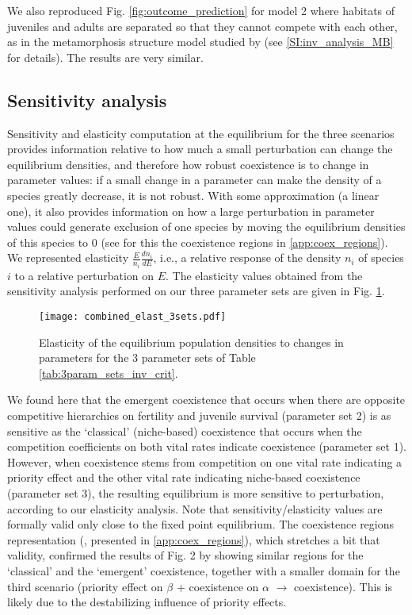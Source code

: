 \documentclass{article}
\begin{document}
We also reproduced Fig. \ref{fig:outcome_prediction} for model 2 where habitats of juveniles and adults are separated so that they cannot compete with each other, as in the metamorphosis structure model studied by \citet{moll2008competition} (see \ref{SI:inv_analysis_MB} for details). The results are very similar.

\subsection{Sensitivity analysis}

Sensitivity and elasticity computation at the equilibrium for the three scenarios provides information relative to how much a small perturbation can change the equilibrium densities, and therefore how robust coexistence is to change in parameter values: if a small change in a parameter can make the density of a species greatly decrease, it is not robust. With some approximation (a linear one), it also provides information on how a large perturbation in parameter values could generate exclusion of one species by moving the equilibrium densities of this species to 0 (see for this the coexistence regions in \ref{app:coex_regions}). We represented elasticity $\frac{E}{n_i}\frac{dn_i}{dE}$, i.e., a relative response of the density $n_i$ of species $i$ to a relative perturbation on $E$. The elasticity values obtained from the sensitivity analysis performed on our three parameter sets are given in Fig. \ref{fig:tab_elast_3sets}. 

\begin{figure}[H]
    \centering
    \texttt{[image: combined\_elast\_3sets.pdf]}
    \caption{Elasticity of the equilibrium population
densities to changes in parameters for the 3 parameter sets of Table \ref{tab:3param_sets_inv_crit}.}
    \label{fig:tab_elast_3sets}
\end{figure}
 We found here that the emergent coexistence that occurs when there are opposite competitive hierarchies on fertility and juvenile survival (parameter set 2) is as sensitive as the `classical' (niche-based) coexistence that occurs when the competition coefficients on both vital rates indicate coexistence (parameter set 1). However, when coexistence stems from competition on one vital rate indicating a priority effect and the other vital rate indicating niche-based coexistence (parameter set 3), the resulting equilibrium is more sensitive to perturbation, according to our elasticity analysis. Note that sensitivity/elasticity values are formally valid only close to the fixed point equilibrium. The coexistence regions representation (\citealt{barabas2014sensitivity}, presented in \ref{app:coex_regions}), which stretches a bit that validity, confirmed the results of Fig. 2 by showing similar regions for the `classical' and the `emergent' coexistence, together with a smaller domain for the third scenario (priority effect on $\beta$ + coexistence on $\alpha$ $\rightarrow$ coexistence). This is likely due to the destabilizing influence of priority effects. 
\end{document}
